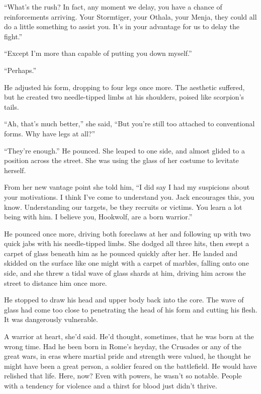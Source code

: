 ``What's the rush?  In fact, any moment we delay, you have a chance of reinforcements arriving.  Your Stormtiger, your Othala, your Menja, they could all do a little something to assist you.  It's in your advantage for us to delay the fight.''



``Except I'm more than capable of putting you down myself.''



``Perhaps.''



He adjusted his form, dropping to four legs once more.  The aesthetic suffered, but he created two needle-tipped limbs at his shoulders, poised like scorpion's tails.



``Ah, that's much better,'' she said, ``But you're still too attached to conventional forms.  Why have legs at all?''



``They're enough.''  He pounced.  She leaped to one side, and almost glided to a position across the street.  She was using the glass of her costume to levitate herself.



From her new vantage point she told him, ``I did say I had my suspicions about your motivations.  I think I've come to understand you. Jack encourages this, you know.  Understanding our targets, be they recruits or victims.  You learn a lot being with him.  I believe you, Hookwolf, are a born warrior.''



He pounced once more, driving both foreclaws at her and following up with two quick jabs with his needle-tipped limbs.  She dodged all three hits, then swept a carpet of glass beneath him as he pounced quickly after her.  He landed and skidded on the surface like one might with a carpet of marbles, falling onto one side, and she threw a tidal wave of glass shards at him, driving him across the street to distance him once more.



He stopped to draw his head and upper body back into the core.  The wave of glass had come too close to penetrating the head of his form and cutting his flesh.  It was dangerously vulnerable.



A warrior at heart, she'd said.  He'd thought, sometimes, that he was born at the wrong time.  Had he been born in Rome's heyday, the Crusades or any of the great wars, in eras where martial pride and strength were valued, he thought he might have been a great person, a soldier feared on the battlefield.  He would have relished that life.  Here, now?  Even with powers, he wasn't so notable.  People with a tendency for violence and a thirst for blood just didn't thrive.



